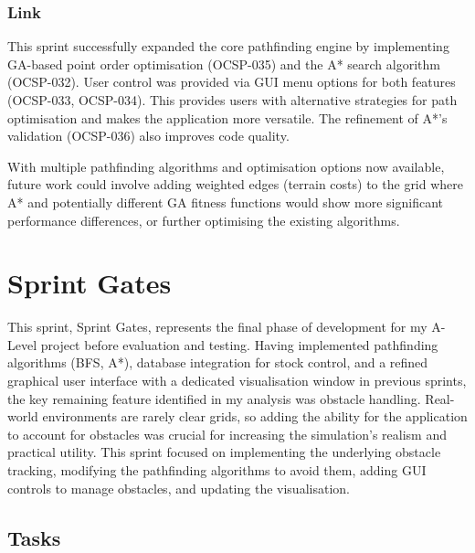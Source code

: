 \subsubsection{Link}
This sprint successfully expanded the core pathfinding engine by implementing GA-based point order optimisation (OCSP-035) and the A* search algorithm (OCSP-032). User control was provided via GUI menu options for both features (OCSP-033, OCSP-034). This provides users with alternative strategies for path optimisation and makes the application more versatile. The refinement of A*'s validation (OCSP-036) also improves code quality.

With multiple pathfinding algorithms and optimisation options now available, future work could involve adding weighted edges (terrain costs) to the grid where A* and potentially different GA fitness functions would show more significant performance differences, or further optimising the existing algorithms.


\newpage


\section{Sprint Gates}

This sprint, Sprint Gates, represents the final phase of development for my A-Level project before evaluation and testing. Having implemented pathfinding algorithms (BFS, A*), database integration for stock control, and a refined graphical user interface with a dedicated visualisation window in previous sprints, the key remaining feature identified in my analysis was obstacle handling. Real-world environments are rarely clear grids, so adding the ability for the application to account for obstacles was crucial for increasing the simulation's realism and practical utility. This sprint focused on implementing the underlying obstacle tracking, modifying the pathfinding algorithms to avoid them, adding GUI controls to manage obstacles, and updating the visualisation.

\subsection{Tasks}

